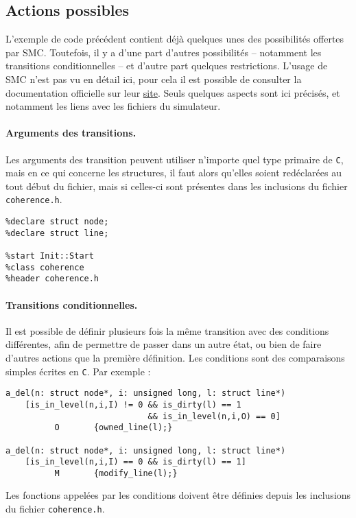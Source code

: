 \subsection{Actions possibles}

L'exemple de code précédent contient déjà quelques unes des possibilités offertes par \textsf{SMC}. Toutefois, il y a d'une part d'autres possibilités -- notamment les transitions conditionnelles -- et d'autre part quelques restrictions. L'usage de \textsf{SMC} n'est pas vu en détail ici, pour cela il est possible de consulter la documentation officielle sur leur \href{http://smc.sourceforge.net/SmcManual.htm}{site}. Seuls quelques aspects sont ici précisés, et notamment les liens avec les fichiers du simulateur.

\paragraph{Arguments des transitions.}
Les arguments des transition peuvent utiliser n'importe quel type primaire de \texttt{C}, mais en ce qui concerne les structures, il faut alors qu'elles soient redéclarées au tout début du fichier, mais si celles-ci sont présentes dans les inclusions du fichier \texttt{coherence.h}.
\begin{framed}
\begin{verbatim}
%declare struct node;
%declare struct line;

%start Init::Start
%class coherence
%header coherence.h
\end{verbatim}
\end{framed}

\paragraph{Transitions conditionnelles.}
Il est possible de définir plusieurs fois la même transition avec des conditions différentes, afin de permettre de passer dans un autre état, ou bien de faire d'autres actions que la première définition. Les conditions sont des comparaisons simples écrites en \texttt{C}. Par exemple :
\begin{framed}
\begin{verbatim}
a_del(n: struct node*, i: unsigned long, l: struct line*)  
    [is_in_level(n,i,I) != 0 && is_dirty(l) == 1 
                             && is_in_level(n,i,O) == 0] 
          O       {owned_line(l);}

a_del(n: struct node*, i: unsigned long, l: struct line*)    
    [is_in_level(n,i,I) == 0 && is_dirty(l) == 1]   
          M       {modify_line(l);}
\end{verbatim}
\end{framed}
Les fonctions appelées par les conditions doivent être définies depuis les inclusions du fichier \texttt{coherence.h}.

